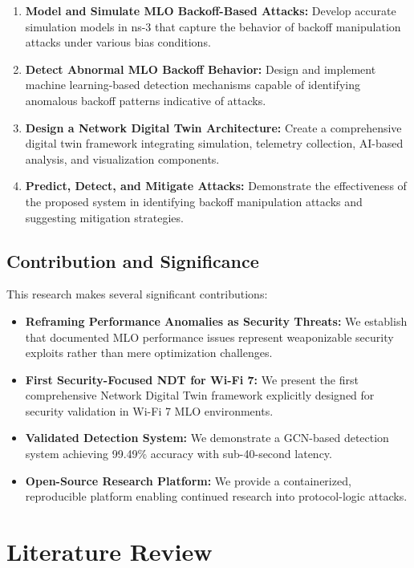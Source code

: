 \documentclass[12pt,a4paper]{article}
\begin{document}
\begin{enumerate}
    \item \textbf{Model and Simulate MLO Backoff-Based Attacks:} Develop accurate simulation models in ns-3 that capture the behavior of backoff manipulation attacks under various bias conditions.
    \item \textbf{Detect Abnormal MLO Backoff Behavior:} Design and implement machine learning-based detection mechanisms capable of identifying anomalous backoff patterns indicative of attacks.
    \item \textbf{Design a Network Digital Twin Architecture:} Create a comprehensive digital twin framework integrating simulation, telemetry collection, AI-based analysis, and visualization components.
    \item \textbf{Predict, Detect, and Mitigate Attacks:} Demonstrate the effectiveness of the proposed system in identifying backoff manipulation attacks and suggesting mitigation strategies.
\end{enumerate}

\subsection{Contribution and Significance}

This research makes several significant contributions:

\begin{itemize}
    \item \textbf{Reframing Performance Anomalies as Security Threats:} We establish that documented MLO performance issues represent weaponizable security exploits rather than mere optimization challenges.
    \item \textbf{First Security-Focused NDT for Wi-Fi 7:} We present the first comprehensive Network Digital Twin framework explicitly designed for security validation in Wi-Fi 7 MLO environments.
    \item \textbf{Validated Detection System:} We demonstrate a GCN-based detection system achieving 99.49\% accuracy with sub-40-second latency.
    \item \textbf{Open-Source Research Platform:} We provide a containerized, reproducible platform enabling continued research into protocol-logic attacks.
\end{itemize}

\section{Literature Review}
\end{document}
